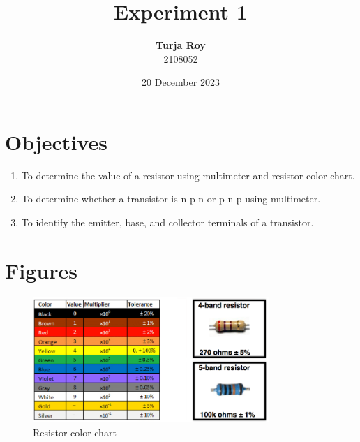 \documentclass[12pt]{article}
\title{
    \textbf{Experiment 1}
}
\author{
    \textbf{Turja Roy}\\
    2108052
}
\date{20 December 2023}
\begin{document}
\maketitle

\section{Objectives}
\begin{enumerate}
    \item To determine the value of a resistor using multimeter and resistor color chart.
    \item To determine whether a transistor is n-p-n or p-n-p using multimeter.
    \item To identify the emitter, base, and collector terminals of a transistor.
\end{enumerate}

\newpage
\section{Figures}
\begin{figure}[h!]
    \centering
    \includegraphics[width=0.8\textwidth]{Color-chart.png}
    \caption{Resistor color chart}
\end{figure}
\end{document}
